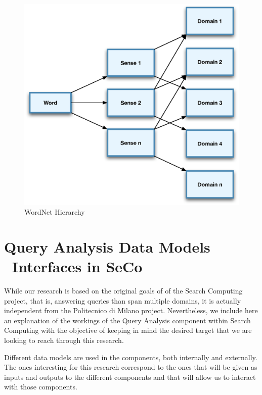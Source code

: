 \begin{figure}[ht!]
  \begin{center}
    \includegraphics[width=\linewidth]{images/wordnethierarchy}
  \end{center}
  \caption{WordNet Hierarchy}\label{fig:wordnethierarchy}
\end{figure}



\section{Query Analysis Data Models \amper\ Interfaces in SeCo} %
\label{sec:data_models}

While our research is based on the original goals of of the Search Computing project, that is, answering queries than span multiple domains, it is actually independent from the Politecnico di Milano project. Nevertheless, we include here an explanation of the workings of the Query Analysis component within Search Computing with the objective of keeping in mind the desired target that we are looking to reach through this research.

Different data models are used in the components, both internally and externally. The ones interesting for this research correspond to the ones that will be given as inputs and outputs to the different components and that will allow us to interact with those components.

